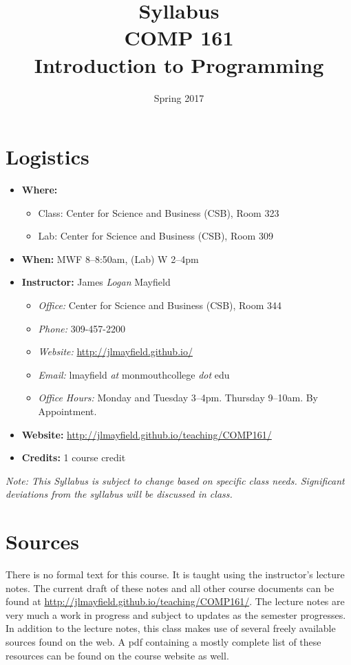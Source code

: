 \documentclass[10pt]{article}
\title{Syllabus \\ COMP 161 \\ Introduction to Programming}
\author{  }
\date{Spring 2017}
\begin{document}
\maketitle

\section{Logistics}
\begin{itemize}
\item \textbf{Where: }
\begin{itemize}
\item Class: Center for Science and Business (CSB), Room 323
\item Lab: Center for Science and Business (CSB), Room 309
\end{itemize}
\item \textbf{When: } MWF 8--8:50am, (Lab) W 2--4pm
\item \textbf{Instructor: } James \textit{Logan} Mayfield
\begin{itemize}
\item \textit{Office: } Center for Science and Business (CSB), Room 344
\item \textit{Phone: } 309-457-2200 %
\item \textit{Website: } \url{http://jlmayfield.github.io/}
\item \textit{Email: } lmayfield \textit{at} monmouthcollege \textit{dot} edu
\item \textit{Office Hours: }  Monday and Tuesday 3--4pm. Thursday 9--10am. By Appointment.
\end{itemize}
\item \textbf{Website: } \url{http://jlmayfield.github.io/teaching/COMP161/}
\item \textbf{Credits: } 1 course credit
\end{itemize}
\emph{Note: This Syllabus is subject to change based on specific class needs. Significant deviations from the syllabus will be discussed in class.}

\section{Sources}

There is no formal text for this course. It is taught using the instructor's lecture notes. The current draft of these notes and all other course documents can be found at \url{http://jlmayfield.github.io/teaching/COMP161/}. The lecture notes are very much a work in progress and subject to updates as the semester progresses. In addition to the lecture notes, this class makes use of several freely available sources found on the web. A pdf containing a mostly complete list of these resources can be found on the course website as well.
\end{document}
